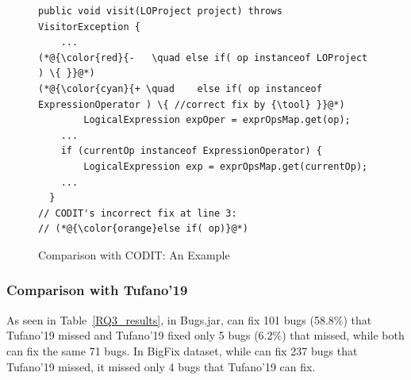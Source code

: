 
\begin{figure}[t]
	\centering
	\begin{lstlisting}[]
public void visit(LOProject project) throws VisitorException {
    ...
(*@{\color{red}{-	\quad else if( op instanceof LOProject ) \{ }}@*)
(*@{\color{cyan}{+ \quad	else if( op instanceof ExpressionOperator ) \{ //correct fix by {\tool} }}@*)
		LogicalExpression expOper = exprOpsMap.get(op);
	...
	if (currentOp instanceof ExpressionOperator) {
		LogicalExpression exp = exprOpsMap.get(currentOp);
	...
  }
// CODIT's incorrect fix at line 3:
// (*@{\color{orange}else if( op)}@*) 
	\end{lstlisting}
        \vspace{-17pt}
	\caption{Comparison with CODIT: An Example}
	\label{example_codit}
\end{figure}

\subsubsection{\bf Comparison with Tufano'19}





As seen in Table~\ref{RQ3_results}, in Bugs.jar, {\tool} can fix 101
bugs (58.8\%) that Tufano'19 missed and Tufano'19 fixed only 5 bugs
(6.2\%) that {\tool} missed, while both can fix the same 71 bugs.
In BigFix dataset, while {\tool} can fix 237 bugs that Tufano'19
missed, it missed only 4 bugs that Tufano'19 can fix.

